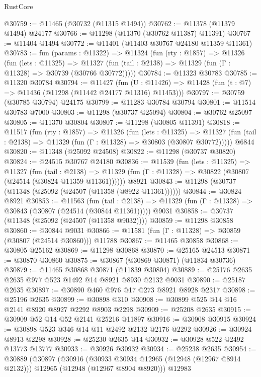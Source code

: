 \begin{lexlean}{RustCore}
\begin{coremodule}
@30759 := @11465 (@30732 (@11315 @1494))
@30762 := @11378 (@11379 @1494) @24177
@30766 := @11298 (@11370 (@30762 @11387) @11391)
@30767 := @11404 @1494
@30772 := @11401 (@11403 @30767 @24180 @11359 @11361)
@30783 := fun (params : @11322) =>
  @11324
    (fun (rty : @1857) =>
    @11326
      (fun (lets : @11325) =>
      @11327 (fun (tail : @2138) => @11329 (fun (Γ : @11328) => @30739 (@30766 @30772)))))
@30784 := @11323 @30783
@30785 := @11320 @30784
@30794 := @11427
    (fun (U : @11426) => @11428 (fun (t : @7) => @11436 (@11298 (@11442 @24177 @11316) @11453)))
@30797 := @30759 (@30785 @30794) @24175
@30799 := @11283 @30784 @30794
@30801 := @11514 @30783 @7000
@30803 := @11298 (@30737 @25094)
@30804 := @30762 @25097
@30805 := @11370 @30804
@30807 := @11298 (@30805 @11391)
@30818 := @11517
    (fun (rty : @1857) =>
    @11326
      (fun (lets : @11325) =>
      @11327 (fun (tail : @2138) => @11329 (fun (Γ : @11328) => @30803 (@30807 @30772)))))
    @6844
@30820 := @11348 (@25092 @24508)
@30822 := @11298 (@30737 @30820)
@30824 := @24515 @30767 @24180
@30836 := @11539
    (fun (lets : @11325) =>
    @11327
      (fun (tail : @2138) =>
      @11329 (fun (Γ : @11328) => @30822 (@30807 (@24514 (@30824 @11359 @11361))))))
    @8921
@30843 := @11298 (@30737 (@11348 (@25092 (@24507 (@11358 (@8922 @11361))))))
@30844 := @30824 @8921
@30853 := @11563
    (fun (tail : @2138) => @11329 (fun (Γ : @11328) => @30843 (@30807 (@24514 (@30844 @11361)))))
    @9031
@30858 := @30737 (@11348 (@25092 (@24507 (@11358 @9032))))
@30859 := @11298 @30858
@30860 := @30844 @9031
@30866 := @11581 (fun (Γ : @11328) => @30859 (@30807 (@24514 @30860))) @11788
@30867 := @11465 @30858
@30868 := @30805 @25162
@30869 := @11298 @30868
@30870 := @25165 @24513
@30871 := @30870 @30860
@30875 := @30867 (@30869 @30871) (@11834 @30736)
@30879 := @11465 @30868 @30871 (@11839 @30804)
@30889 := @25176 @2635 @2635 @977 @523 @1492 @14 @8921 @8930 @2132 @9031
@30890 := @25187 @2635
@30897 := @30890 @460 @976 @17 @273 @8921 @8928 @2317
@30898 := @25196 @2635
@30899 := @30898 @310
@30908 := @30899 @525 @14 @16 @2141 @8920 @8927 @2292 @8903 @2298
@30909 := @25208 @2635
@30915 := @30909 @52 @14 @52 @2141 @25216 @11897
@30916 := @30908 @30915
@30924 := @30898 @523 @346 @14 @11 @2492 @2132 @2176 @2292
@30926 := @30924 @8913 @2298
@30928 := @25230 @2635 @14
@30932 := @30928 @522 @2492 @13773 @13777
@30933 := @30926 @30932
@30934 := @25238 @2635
@30954 := @30889
    (@30897
      (@30916
        (@30933 @30934 @12965 (@12948 (@12967 @8914 @2132)))
        @12965
        (@12948 (@12967 @8904 @8920)))
      @12983

\end{coremodule}
\end{lexlean}
